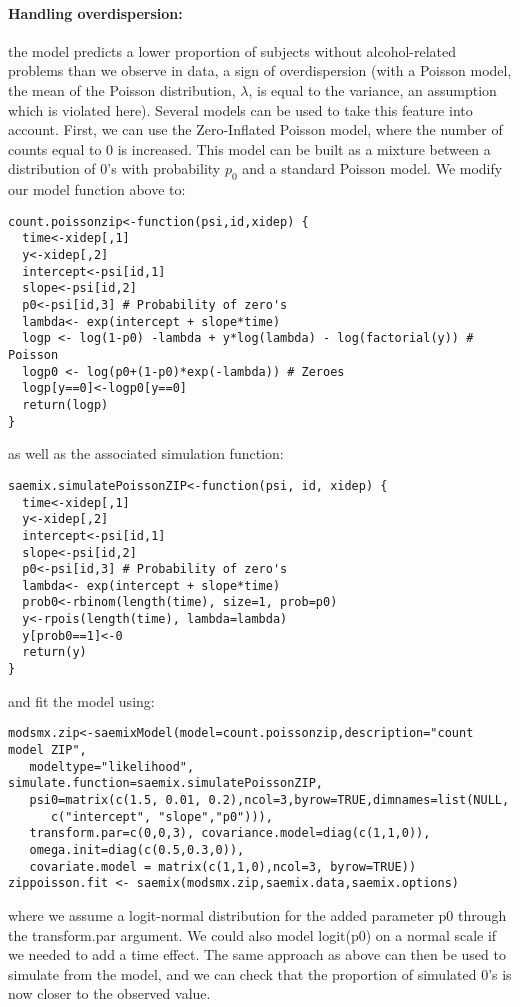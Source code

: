 \paragraph{Handling overdispersion:} the model predicts a lower proportion of subjects without alcohol-related problems than we observe in data, a sign of overdispersion (with a Poisson model, the mean of the Poisson distribution, $\lambda$, is equal to the variance, an assumption which is violated here). Several models can be used to take this feature into account. First, we can use the Zero-Inflated Poisson model, where the number of counts equal to 0 is increased. This model can be built as a mixture between a distribution of 0's with probability $p_0$ and a standard Poisson model. We modify our model function above to:
\par \kern -0.5cm
\begin{verbatim}
count.poissonzip<-function(psi,id,xidep) {
  time<-xidep[,1]
  y<-xidep[,2]
  intercept<-psi[id,1]
  slope<-psi[id,2]
  p0<-psi[id,3] # Probability of zero's
  lambda<- exp(intercept + slope*time)
  logp <- log(1-p0) -lambda + y*log(lambda) - log(factorial(y)) # Poisson
  logp0 <- log(p0+(1-p0)*exp(-lambda)) # Zeroes
  logp[y==0]<-logp0[y==0]
  return(logp)
}
\end{verbatim}
as well as the associated simulation function:
\par \kern -0.5cm
\begin{verbatim}
saemix.simulatePoissonZIP<-function(psi, id, xidep) {
  time<-xidep[,1]
  y<-xidep[,2]
  intercept<-psi[id,1]
  slope<-psi[id,2]
  p0<-psi[id,3] # Probability of zero's
  lambda<- exp(intercept + slope*time)
  prob0<-rbinom(length(time), size=1, prob=p0)
  y<-rpois(length(time), lambda=lambda)
  y[prob0==1]<-0
  return(y)
}
\end{verbatim}
and fit the model using:
\par \kern -0.5cm
\begin{verbatim}
modsmx.zip<-saemixModel(model=count.poissonzip,description="count model ZIP",
   modeltype="likelihood", simulate.function=saemix.simulatePoissonZIP,
   psi0=matrix(c(1.5, 0.01, 0.2),ncol=3,byrow=TRUE,dimnames=list(NULL, 
      c("intercept", "slope","p0"))), 
   transform.par=c(0,0,3), covariance.model=diag(c(1,1,0)), 
   omega.init=diag(c(0.5,0.3,0)),
   covariate.model = matrix(c(1,1,0),ncol=3, byrow=TRUE))
zippoisson.fit <- saemix(modsmx.zip,saemix.data,saemix.options)
\end{verbatim}
where we assume a logit-normal distribution for the added parameter p0 through the transform.par argument. We could also model logit(p0) on a normal scale if we needed to add a time effect. The same approach as above can then be used to simulate from the model, and we can check that the proportion of simulated 0's is now closer to the observed value.

